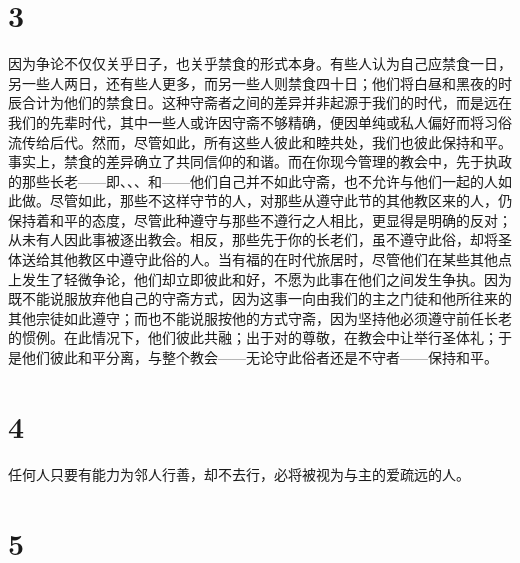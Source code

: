 
\section{3}

因为争论不仅仅关乎日子，也关乎禁食的形式本身。有些人认为自己应禁食一日，另一些人两日，还有些人更多，而另一些人则禁食四十日；他们将白昼和黑夜的时辰合计为他们的禁食日。这种守斋者之间的差异并非起源于我们的时代，而是远在我们的先辈时代，其中一些人或许因守斋不够精确，便因单纯或私人偏好而将习俗流传给后代。然而，尽管如此，所有这些人彼此和睦共处，我们也彼此保持和平。事实上，禁食的差异确立了共同信仰的和谐。而在你现今管理的教会中，先于执政的那些长老——即、、、和——他们自己并不如此守斋，也不允许与他们一起的人如此做。尽管如此，那些不这样守节的人，对那些从遵守此节的其他教区来的人，仍保持着和平的态度，尽管此种遵守与那些不遵行之人相比，更显得是明确的反对；从未有人因此事被逐出教会。相反，那些先于你的长老们，虽不遵守此俗，却将圣体送给其他教区中遵守此俗的人。当有福的在时代旅居时，尽管他们在某些其他点上发生了轻微争论，他们却立即彼此和好，不愿为此事在他们之间发生争执。因为既不能说服放弃他自己的守斋方式，因为这事一向由我们的主之门徒和他所往来的其他宗徒如此遵守；而也不能说服按他的方式守斋，因为坚持他必须遵守前任长老的惯例。在此情况下，他们彼此共融；出于对的尊敬，在教会中让举行圣体礼；于是他们彼此和平分离，与整个教会——无论守此俗者还是不守者——保持和平。\par


\section{4}

任何人只要有能力为邻人行善，却不去行，必将被视为与主的爱疏远的人。\par


\section{5}

